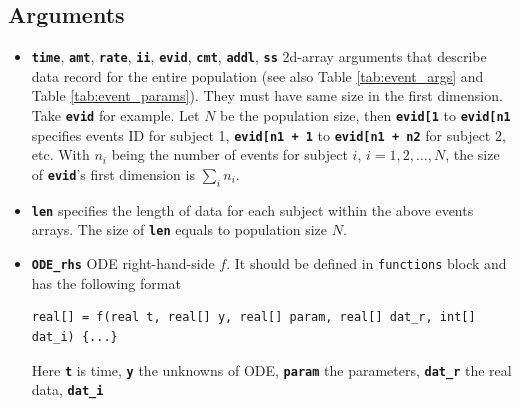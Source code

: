 \documentclass[10pt, reqno, oneside]{amsbook}
\numberwithin{equation}{chapter}
\numberwithin{figure}{chapter}
\numberwithin{table}{chapter}
\theoremstyle{remark}
\begin{document}
\subsection{Arguments}
\label{sec:org4c4791a}
\begin{itemize}
\item {\small \color{MRGGreen} \texttt{\textbf{time}}}, {\small \color{MRGGreen} \texttt{\textbf{amt}}}, {\small \color{MRGGreen} \texttt{\textbf{rate}}}, {\small \color{MRGGreen} \texttt{\textbf{ii}}}, {\small \color{MRGGreen} \texttt{\textbf{evid}}}, {\small \color{MRGGreen} \texttt{\textbf{cmt}}}, {\small \color{MRGGreen} \texttt{\textbf{addl}}}, {\small \color{MRGGreen} \texttt{\textbf{ss}}}
\label{sec:orgcc63996}
2d-array arguments that describe data record for the
entire population (see also Table \ref{tab:event_args} and Table \ref{tab:event_params}). They must have same size in the first
dimension. Take {\small \color{MRGGreen} \texttt{\textbf{evid}}} for example. Let \(N\) be the
population size, then {\small \color{MRGGreen} \texttt{\textbf{evid[1}}} to
{\small \color{MRGGreen} \texttt{\textbf{evid[n1}}} specifies events ID for subject 1,
{\small \color{MRGGreen} \texttt{\textbf{evid[n1 + 1}}} to
{\small \color{MRGGreen} \texttt{\textbf{evid[n1 + n2}}} for subject 2, etc. With \(n_i\)
being the number of events for subject \(i\), \(i=1, 2, \dots, N\), the
size of {\small \color{MRGGreen} \texttt{\textbf{evid}}}'s first dimension is \(\sum_{i}n_i\).
\item {\small \color{MRGGreen} \texttt{\textbf{len}}}
\label{sec:org3a8e95c}
specifies the length of data for each subject within
the above events arrays. The size of {\small \color{MRGGreen} \texttt{\textbf{len}}} equals
to population size \(N\).
\item {\small \color{MRGGreen} \texttt{\textbf{ODE\_rhs}}}
\label{sec:org0d17e8a}
ODE right-hand-side \(f\). It should be defined in
\texttt{functions} block and has the following format
\begin{verbatim}
real[] = f(real t, real[] y, real[] param, real[] dat_r, int[] dat_i) {...}
\end{verbatim}
Here {\small \color{MRGGreen} \texttt{\textbf{t}}} is time, {\small \color{MRGGreen} \texttt{\textbf{y}}} the unknowns of ODE, {\small \color{MRGGreen} \texttt{\textbf{param}}} the parameters, {\small \color{MRGGreen} \texttt{\textbf{dat\_r}}} the real data, {\small \color{MRGGreen} \texttt{\textbf{dat\_i}}}

\end{itemize}
\end{document}
